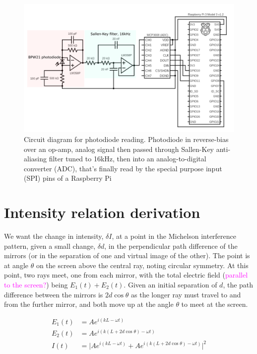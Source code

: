 \documentclass[prb,preprint]{revtex4-1}
\newcommand{\jam}{\textcolor{magenta}}
\begin{document}
\begin{figure}%
	\includegraphics[width=\textwidth]{figures/circuit_diagram_2.pdf}
	\caption{Circuit diagram for photodiode reading. Photodiode in reverse-bias over an op-amp, analog signal then passed through Sallen-Key anti-aliasing filter tuned to 16kHz, then into an analog-to-digital converter (ADC), that’s finally read by the special purpose input (SPI) pins of a Raspberry Pi}
	\label{fig:circuit_diagram}
\end{figure}


\section{Intensity relation derivation}
\label{app:intensity_derivation}

We want the change in intensity, $\delta I$, at a point in the Michelson interference pattern, given a small change, $\delta d$, in the perpendicular path difference of the mirrors (or in the separation of one and virtual image of the other). The point is at angle $\theta$ on the screen above the central ray, noting circular symmetry. At this point, two rays meet, one from each mirror, with the total electric field (\jam{parallel to the screen?}) being $E_1(t) + E_2(t)$. Given an initial separation of $d$, the path difference between the mirrors is $2 d \cos{\theta}$ as the longer ray must travel to and from the further mirror, and both move up at the angle $\theta$ to meet at the screen.

\begin{align}
\label{eq:intensity_derivation}
    E_1(t) &= A e^{i (k L - \omega t)} \\
    E_2(t) &= A e^{i (k (L + 2 d \cos{\theta}) - \omega t)} \\
    I(t) &= \lvert A e^{i (k L - \omega t)} + A e^{i (k (L + 2 d \cos{\theta}) - \omega t)} \rvert^2
\end{align}
\end{document}
